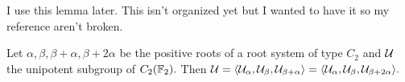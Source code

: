 \documentclass[class=book, crop=false,12 pt]{standalone}
\begin{document}
%
I use this lemma later. This isn't organized yet but I wanted to have it so my reference aren't broken.
\begin{lemma} Let $\alpha,\beta,\beta+\alpha,\beta+2\alpha$ be the positive roots of a root system of type $C_2$ and $\mathcal{U}$ the unipotent subgroup of $C_2(\mathbb{F}_{2}).$ Then $\mathcal{U}=\langle \mathcal{U}_\alpha,\mathcal{U}_\beta,\mathcal{U}_{\beta+\alpha}\rangle=\langle \mathcal{U}_\alpha,\mathcal{U}_\beta,\mathcal{U}_{\beta+2\alpha}\rangle.$
	\label{c2f2gen}
\end{lemma}
%
%
%
\end{document}
